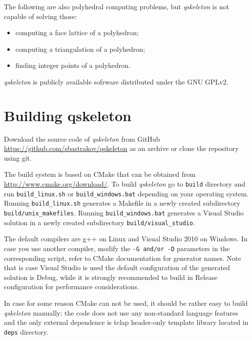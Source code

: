 \documentclass{article}
\newcommand{\qskeleton}{{\itshape qskeleton}\xspace}
\begin{document}
The following are also polyhedral computing problems, but \qskeleton is not capable of solving those:
\begin{itemize}
\item computing a face lattice of a polyhedron;
\item computing a triangulation of a polyhedron;
\item finding integer points of a polyhedron.
\end{itemize}

\qskeleton is publicly available sofrware distributed under the GNU GPLv2.




\section{Building qskeleton}

Download the source code of \qskeleton from GitHub \newline \url{https://github.com/sbastrakov/qskeleton} as an archive or clone the repository using git.

The build system is based on CMake that can be obtained from \newline \url{http://www.cmake.org/download/}. To build \qskeleton go to {\tt build} directory and run {\tt build\_linux.sh} or {\tt build\_windows.bat} depending on your operating system. Running {\tt build\_linux.sh} generates a Makefile in a newly created subdirectory {\tt build/unix\_makefiles}. Running {\tt build\_windows.bat} generates a Visual Studio solution in a newly created subdirectory {\tt build/visual\_studio}. 

The default compilers are g++ on Linux and Visual Studio 2010 on Windows. In case you use another compiler, modify the {\tt -G and/or -D} parameters in the corresponding script, refer to CMake documentation for generator names. Note that is case Visual Studio is used the default configuration of the generated solution is Debug, while it is strongly recommended to build in Release configuration for performance considerations. 

In case for some reason CMake can not be used, it should be rather easy to build \qskeleton manually: the code does not use any non-standard language features and the only external dependence is tclap header-only template library located in {\tt deps} directory.
\end{document}
